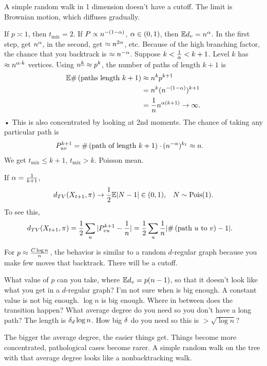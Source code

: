 A simple random walk in 1 dimension doesn't have a cutoff. The limit is %
Brownian motion, which diffuses gradually.

If $p\asymp 1$, then $t_{\text{mix}}=2$. If $P\propto n^{-(1-\alpha)}$, $\alpha \in (0,1)$, then $\mathbb{E} d_v=n^\alpha$. In the first step, get $n^\alpha$, in the second, get $\approx n^{2\alpha}$, etc. Because of the high branching factor, the chance that you backtrack is $\approx n^{-\alpha}$. 
Suppose $k<\frac{1}{\alpha} < k+1$.
Level $k$ has $\approx n^{\alpha\cdot k}$ vertices.
Using $n^{\underline{k}}\approx p^k$, the number of paths of length $k+1$ is 
\begin{align}
\mathbb{E} \#\left( \text{paths length $k+1$} \right)
&\approx n^k p^{k+1}\\
&=n^k (n^{-(1-\alpha)})^{k+1}\\
&=\frac{1}{n} n^{\alpha(k+1)}\to \infty.
\end{align}•
This is also concentrated by looking at 2nd moments. The chance of taking any particular path is
\begin{align}
P_{uv}^{k+1} &= \#\left( \text{path of length $k+1$} \right)\cdot (n^{-\alpha})^{k_1} \approx n.
\end{align}
We get $t_{\text{mix}}\le k+1$, $t_{\text{mix}}> k$.
Poisson mean.

If $\alpha=\frac{1}{k+1}$, 
\begin{align}
d_{TV}(X_{t+1},\pi) &\to \frac{1}{2}\mathbb{E} |N-1|\in (0,1),&N\sim \operatorname{Pois}(1).
\end{align}
To see this,
\begin{align}
d_{TV}(X_{t+1},\pi) &= \frac{1}{2} 
\sum_u 
|P_{vu}^{k+1}-\frac{1}{n}| = 
\frac{1}{2} \sum_u  \frac{1}{n} |\#\left( \text{path $u$ to $v$} \right) - 1|.
\end{align}

For $p\approx \frac{C\log n}{n}$, the behavior is similar to a 
random $d$-regular graph because you make few moves that backtrack. There will be a cutoff.

What value of $p$ can you take, where $\mathbb{E} d_v = p(n-1)$, so that it doesn't look like what you get in a $d$-regular graph?
I'm not sure when is big enough. A constant value is not big enough. $\log n$ is big enough. Where in between does the transition happen? What average degree do you need so you don't have a long path? The length is $\delta_d\log n$.
How big $\delta$ do you need so this is $>\sqrt{\log n}$?

The bigger the average degree, the easier things get. Things become more concentrated, pathological cases become rarer. %
A simple random walk on the tree with that average degree looks like a nonbacktracking walk. 

